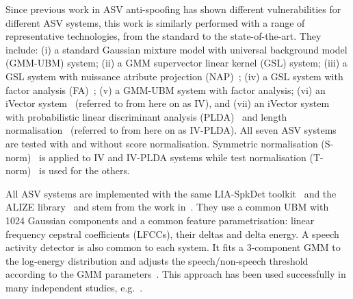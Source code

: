 
Since previous work in ASV anti-spoofing has shown different vulnerabilities for different ASV systems, this work is similarly performed with a range of representative technologies, from the standard to the state-of-the-art.
They include: 
(i) a standard Gaussian mixture model with universal background model (GMM-UBM) system;
(ii) a GMM supervector linear kernel (GSL) system;
(iii) a GSL system with nuissance atribute projection (NAP)~\cite{Campbell2006};
(iv) a GSL system with factor analysis (FA)~\cite{Fauve2007};
(v) a GMM-UBM system with factor analysis;
(vi) an iVector system~\cite{Dehak2011} (referred to from here on as IV), and 
(vii) an iVector system  with probabilistic linear discriminant analysis (PLDA)~\cite{Li2012} and length normalisation~\cite{Garcia2011} (referred to from here on as IV-PLDA). 
All seven ASV systems are tested with and without score normalisation.  
Symmetric normalisation (S-norm)~\cite{Kenny2010} is applied to IV and IV-PLDA systems while test normalisation (T-norm)~\cite{Auckenthaler2000} is used for the others. 

All ASV systems are implemented with the same LIA-SpkDet toolkit~\cite{Bonastre2008} and the ALIZE library~\cite{Bonastre2004} and stem from the work in~\cite{Fauve2007}.
They use a common UBM with 1024 Gaussian components and a common feature parametrisation: linear frequency cepstral coefficients (LFCCs), their deltas and delta energy. 
A speech activity detector is also common to each system.  
It fits a 3-component GMM to the log-energy distribution and adjusts the speech/non-speech threshold according to the GMM parameters~\cite{Bimbot2004}.
This approach has been used successfully in many independent studies, e.g.~\cite{magrin2001,fauve2008}. 
